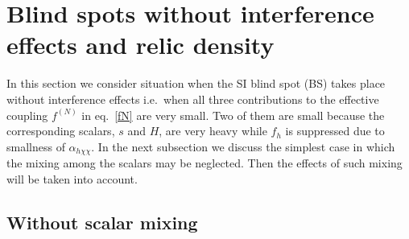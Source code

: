 \documentclass[12pt,twoside]{article}
\begin{document}
\section{Blind spots without interference effects and relic density 
\label{sec:bs_fh}}


In this section we consider situation when the SI blind spot (BS)
takes place without interference effects i.e.~when all three 
contributions to the effective coupling $f^{(N)}$ in eq.~\eqref{fN} 
are very small. Two of them are small because the corresponding 
scalars, $s$ and $H$, are very heavy while $f_{h}$ is suppressed 
due to smallness of $\alpha_{h\chi\chi}$.
In the next subsection we discuss the simplest case in which the 
mixing among the scalars may be neglected. Then the effects of 
such mixing will be taken into account.


\subsection{Without scalar mixing \label{ssec:bs_fh_nomix}}
\end{document}
